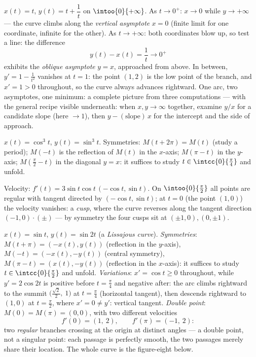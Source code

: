 \begin{example}
\label{ex:b1:curves:asymptotes}
$x(t) = t$, $y(t) = t + \dfrac1t$ on $\intoo{0}{+\infty}$. As $t
\to 0^{+}$: $x \to 0$ while $y \to +\infty$ --- the curve climbs
along the \emph{vertical asymptote} $x = 0$ (finite limit for
one coordinate, infinite for the other). As $t \to +\infty$:
both coordinates blow up, so test a line: the difference
\[
y(t) - x(t) = \frac1t \longrightarrow 0^{+}
\]
exhibits the \emph{oblique asymptote} $y = x$, approached from
above. In between, $y' = 1 - \frac1{t^2}$ vanishes at $t = 1$:
the point $(1, 2)$ is the low point of the branch, and $x' = 1 >
0$ throughout, so the curve always advances rightward. One arc,
two asymptotes, one minimum: a complete picture from three
computations --- with the general recipe visible underneath:
when $x, y \to \infty$ together, examine $y/x$ for a candidate
slope (here $\to 1$), then $y - (\text{slope})\,x$ for the
intercept and the side of approach.
\end{example}

\begin{example}\label{ex:b1:curves:astroid}
$x(t) = \cos^3 t$, $y(t) = \sin^3 t$. Symmetries:
$M(t + 2\pi) = M(t)$ (study a period); $M(-t)$ is the reflection of
$M(t)$ in the $x$-axis; $M(\pi - t)$ in the $y$-axis; $M(\frac\pi2 -
t)$ in the diagonal $y = x$: it suffices to study $t \in
\intcc{0}{\frac\pi4}$ and unfold.

Velocity: $f'(t) = 3\sin t\cos t\,(-\cos t, \sin t)$. On
$\intoo{0}{\frac\pi2}$ all points are regular with tangent directed
by $(-\cos t, \sin t)$; at $t = 0$ (the point $(1,0)$) the velocity
vanishes: a \emph{cusp}, where the curve reverses along
the tangent direction $(-1, 0)\cdot(\pm)$ --- by symmetry the four
cusps sit at $(\pm1, 0), (0, \pm1)$.
\end{example}

\begin{example}
\label{ex:b1:curves:lissajous}
$x(t) = \sin t$, $y(t) = \sin 2t$ (a \emph{Lissajous curve}).
\emph{Symmetries}: $M(t + \pi) = (-x(t), y(t))$ (reflection in
the $y$-axis), $M(-t) = (-x(t), -y(t))$ (central symmetry),
$M(\pi - t) = (x(t), -y(t))$ (reflection in the $x$-axis): it
suffices to study $t \in \intcc{0}{\frac\pi2}$ and unfold.
\emph{Variations}: $x' = \cos t \geq 0$ throughout, while $y' =
2\cos 2t$ is positive before $t = \frac\pi4$ and negative after:
the arc climbs rightward to the summit
$\bigl(\frac{\sqrt2}2,\ 1\bigr)$ at $t = \frac\pi4$ (horizontal
tangent), then descends rightward to $(1, 0)$ at $t =
\frac\pi2$, where $x' = 0 \neq y'$: vertical tangent.
\emph{Double point}: $M(0) = M(\pi) = (0,0)$, with two different
velocities
\[
f'(0) = (1,\ 2), \qquad f'(\pi) = (-1,\ 2) :
\]
two \emph{regular} branches crossing at the origin at distinct
angles --- a double point, not a singular point: each passage is
perfectly smooth, the two passages merely share their location.
The whole curve is the figure-eight below.
\end{example}

